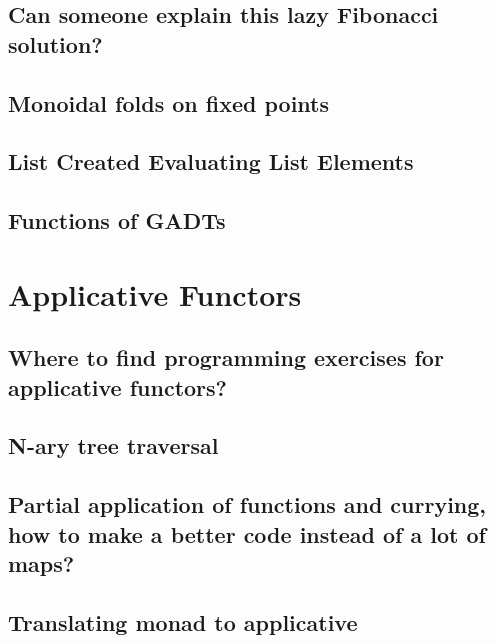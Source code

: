 \documentclass{book}
\begin{document}
\section{Can someone explain this lazy Fibonacci solution?}


\section{Monoidal folds on fixed points}


\section{List Created Evaluating List Elements}


\section{Functions of GADTs}



\chapter{Applicative Functors}

\section{Where to find programming exercises for applicative functors?}


\section{N-ary tree traversal}


\section{Partial application of functions and currying, how to make a better code instead of a lot of maps?}


\section{Translating monad to applicative}

\end{document}
